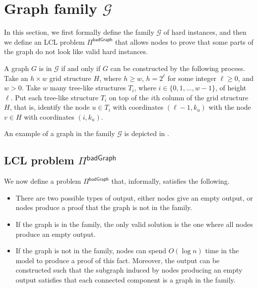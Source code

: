 \documentclass[11pt]{article}
\newcommand{\lbadgraph}{\mathsf {badGraph}}
\begin{document}
\section{Graph family \texorpdfstring{\boldmath$\mathcal{G}$}{G}}\label{sec:graph-family}

In this section, we first formally define the family $\mathcal{G}$ of hard instances, and then we define an LCL problem $\Pi^{\lbadgraph}$ that allows nodes to prove that some parts of the graph do not look like valid hard instances.

\begin{definition}
	A graph $G$ is in $\mathcal{G}$ if and only if $G$ can be constructed by the following process.
	Take an $h\times w$ grid structure $H$, where $h \ge w$, $h = 2^\ell$ for some integer $\ell \ge 0$, and $w > 0$. Take $w$ many tree-like structures $T_i$, where $i\in\{0,1,\dotsc, w-1\}$, of height $\ell$. Put each tree-like structure $T_i$ on top of the $i$th column of the grid structure $H$, that is, identify the node $u\in T_i$ with coordinates $(\ell-1,k_u)$ with the node $v\in H$ with coordinates $(i,k_u)$. 
\end{definition}
An example of a graph in the family $\mathcal{G}$ is depicted in .



\subsection{LCL problem \texorpdfstring{\boldmath$\Pi^{\lbadgraph}$}{Pi-badGraph}}

We now define a problem $\Pi^{\lbadgraph}$ that, informally, satisfies the following.
\begin{itemize}
	\item There are two possible types of output, either nodes give an empty output, or nodes produce a proof that the graph is not in the family.
	\item If the graph is in the family, the only valid solution is the one where all nodes produce an empty output.
	\item If the graph is not in the family, nodes can spend $O(\log n)$ time in the \local model to produce a proof of this fact. Moreover, the output can be constructed such that the subgraph induced by nodes producing an empty output satisfies that each connected component is a graph in the family.
\end{itemize}
\end{document}
